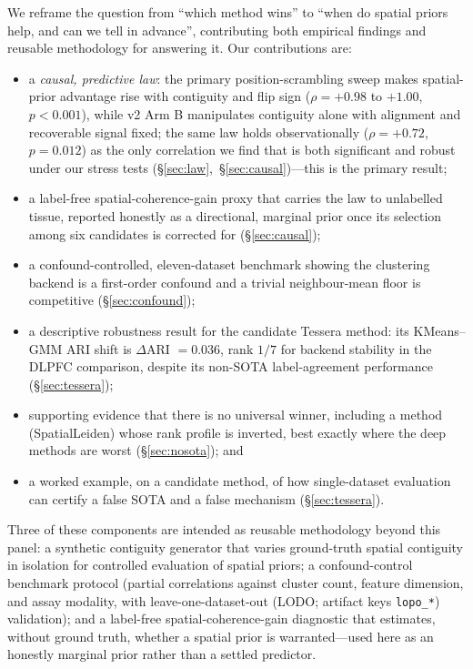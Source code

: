 \documentclass[journal]{IEEEtran}
\begin{document}
We reframe the question from ``which method wins'' to ``when do spatial priors help, and can we tell in
advance'', contributing both empirical findings and reusable methodology for answering it. Our contributions are:
\begin{itemize}\setlength{\itemsep}{2pt}
\item a \emph{causal, predictive law}: the primary position-scrambling sweep makes spatial-prior
advantage rise with contiguity and flip sign ($\rho=+0.98$ to $+1.00$, $p<0.001$), while v2 Arm B
manipulates contiguity alone with alignment and recoverable signal fixed; the same law holds
observationally ($\rho=+0.72$, $p=0.012$) as the only correlation we find that is both significant and robust
under our stress tests (\S\ref{sec:law},~\S\ref{sec:causal})---this is the primary result;
\item a label-free spatial-coherence-gain proxy that carries the law to unlabelled tissue, reported honestly
as a directional, marginal prior once its selection among six candidates is corrected for (\S\ref{sec:causal});
\item a confound-controlled, eleven-dataset benchmark showing the clustering backend is a first-order
confound and a trivial neighbour-mean floor is competitive (\S\ref{sec:confound});
\item a descriptive robustness result for the candidate Tessera method: its KMeans--GMM ARI shift is
$\Delta$ARI $=0.036$, rank $1/7$ for backend stability in the DLPFC comparison, despite its non-SOTA
label-agreement performance (\S\ref{sec:tessera});
\item supporting evidence that there is no universal winner, including a method (SpatialLeiden) whose rank
profile is inverted, best exactly where the deep methods are worst (\S\ref{sec:nosota}); and
\item a worked example, on a candidate method, of how single-dataset evaluation can certify a false SOTA
and a false mechanism (\S\ref{sec:tessera}).
\end{itemize}
Three of these components are intended as reusable methodology beyond this panel: a synthetic contiguity
generator that varies ground-truth spatial contiguity in isolation for controlled evaluation of spatial
priors; a confound-control benchmark protocol (partial correlations against cluster count, feature
dimension, and assay modality, with leave-one-dataset-out (LODO; artifact keys \texttt{lopo\_*})
validation); and a label-free
spatial-coherence-gain diagnostic that estimates, without ground truth, whether a spatial prior is
warranted---used here as an honestly marginal prior rather than a settled predictor.
\end{document}
